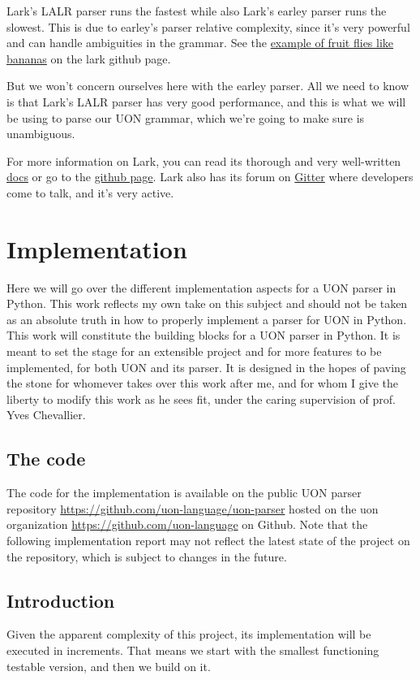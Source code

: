 \documentclass[12pt]{article}
\begin{document}
Lark's LALR parser runs the fastest while also Lark's earley parser runs the slowest. This is due to earley's parser relative complexity, since it's very powerful and can handle ambiguities in the grammar. See the \href{https://github.com/lark-parser/lark/blob/master/examples/fruitflies.py}{example of fruit flies like bananas} on the lark github page.

But we won't concern ourselves here with the earley parser. All we need to know is that Lark's LALR parser has very good performance, and this is what we will be using to parse our UON grammar, which we're going to make sure is unambiguous.

For more information on Lark, you can read its thorough and very well-written \href{https://lark-parser.readthedocs.io/en/latest/}{docs} or go to the \href{https://github.com/lark-parser/lark}{github page}. Lark also has its forum on \href{https://gitter.im/lark-parser/Lobby}{Gitter} where developers come to talk, and it's very active.

\pagebreak

\section{Implementation}
Here we will go over the different implementation aspects for a UON parser in Python. This work reflects my own take on this subject and should not be taken as an absolute truth in how to properly implement a parser for UON in Python. This work will constitute the building blocks for a UON parser in Python. It is meant to set the stage for an extensible project and for more features to be implemented, for both UON and its parser. It is designed in the hopes of paving the stone for whomever takes over this work after me, and for whom I give the liberty to modify this work as he sees fit, under the caring supervision of prof. Yves Chevallier.

\subsection{The code}
The code for the implementation is available on the public UON parser repository \url{https://github.com/uon-language/uon-parser} hosted on the uon organization \url{https://github.com/uon-language} on Github. Note that the following implementation report may not reflect the latest state of the project on the repository, which is subject to changes in the future.

\subsection{Introduction}
Given the apparent complexity of this project, its implementation will be executed in increments. That means we start with the smallest functioning testable version, and then we build on it.
\end{document}
